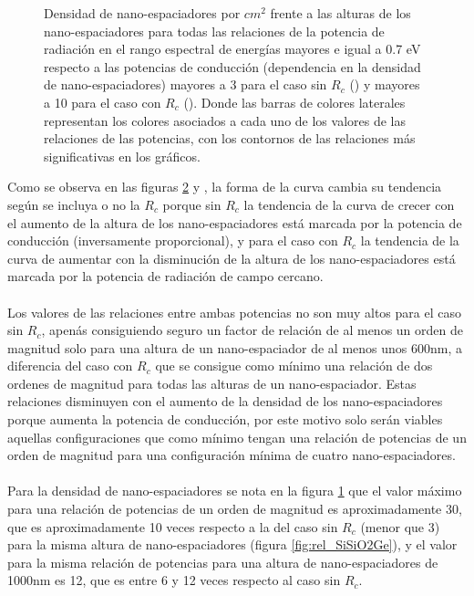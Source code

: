 \begin{figure}[H]
\begin{subfigure}[b]{0.49\textwidth}
			\label{fig:rel_SiSiO2Ge_Rc}
		\end{subfigure}
	\caption{Densidad de nano-espaciadores por $cm^2$ frente a las alturas de los nano-espaciadores para todas las relaciones de la potencia de radiación en el rango espectral de energías mayores e igual a 0.7 eV respecto a las potencias de conducción (dependencia en la densidad de nano-espaciadores) mayores a 3 para el caso sin $R_c$ () y mayores a 10 para el caso con $R_c$ (). Donde las barras de colores laterales representan los colores asociados a cada uno de los valores de las relaciones de las potencias, con los contornos de las relaciones más significativas en los gráficos.}
	\label{fig:relation_SiSiO2Ge}
\end{figure}
Como se observa en las figuras \ref{fig:relation_SiSiO2Ge}  y , la forma de la curva cambia su tendencia según se incluya o no la $R_c$ porque sin $R_c$ la tendencia de la curva de crecer con el aumento de la altura de los nano-espaciadores está marcada por la potencia de conducción (inversamente proporcional), y para el caso con $R_c$ la  tendencia de la curva de aumentar con la disminución de la altura de los nano-espaciadores está marcada por la potencia de radiación de campo cercano.\\\\
Los valores de las relaciones entre ambas potencias no son muy altos para el caso sin $R_c$, apenás consiguiendo seguro un factor de relación de al menos un orden de magnitud solo para una altura de un nano-espaciador de al menos unos 600nm, a diferencia del caso con $R_c$ que se consigue como mínimo una relación de dos ordenes de magnitud para todas las alturas de un nano-espaciador. Estas relaciones disminuyen con el aumento de la densidad de los nano-espaciadores porque aumenta la potencia de conducción, por este motivo solo serán viables aquellas configuraciones que como mínimo tengan una relación de potencias de un orden de magnitud para una configuración mínima de cuatro nano-espaciadores.\\\\
Para la densidad de nano-espaciadores se nota en la figura \ref{fig:rel_SiSiO2Ge_Rc} que el valor máximo para una relación de potencias de un orden de magnitud es aproximadamente 30, que es aproximadamente 10 veces respecto a la del caso sin $R_c$ (menor que 3) para la misma altura de nano-espaciadores (figura \ref{fig:rel_SiSiO2Ge}), y el valor para la misma relación de potencias para una altura de nano-espaciadores de 1000nm es 12, que es entre 6 y 12 veces respecto al caso sin $R_c$.\\\\

